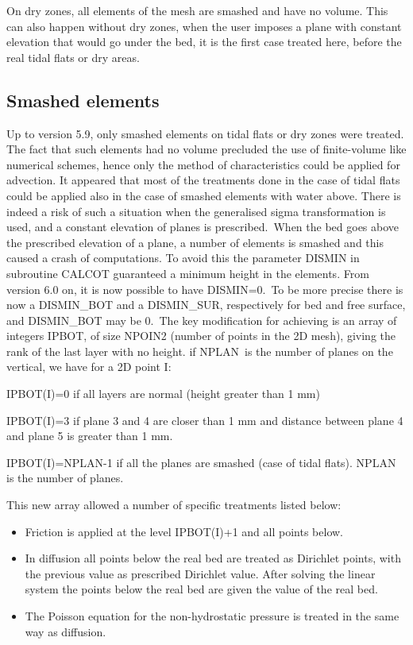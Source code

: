 On dry zones, all elements of the mesh are smashed and have no volume. This
can also happen without dry zones, when the user imposes a plane with constant
elevation that would go under the bed, it is the first case treated here,
before the real tidal flats or dry areas.

\subsection{Smashed elements}

Up to version 5.9, only smashed elements on tidal flats or dry zones were
treated. The fact that such elements had no volume precluded the use of
finite-volume like numerical schemes, hence only the method of characteristics
could be applied for advection. It appeared that most of the treatments done
in the case of tidal flats could be applied also in the case of smashed
elements with water above. There is indeed a risk of such a situation when the
generalised sigma transformation is used, and a constant elevation of planes
is prescribed.\ When the bed goes above the prescribed elevation of a
plane, a number of elements is smashed and this caused a crash of
computations. To avoid this the parameter DISMIN in subroutine CALCOT
guaranteed a minimum height in the elements. From version 6.0 on, it is now
possible to have DISMIN=0.\ To be more precise there is now a DISMIN\_BOT and
a DISMIN\_SUR, respectively for bed and free surface, and DISMIN\_BOT may
be 0.\ The key modification for achieving is an array of integers IPBOT, of
size NPOIN2 (number of points in the 2D mesh), giving the rank of the last
layer with no height. if NPLAN\ is the number of planes on the vertical, we
have for a 2D point I:

IPBOT(I)=0 if all layers are normal (height greater than 1 mm)

IPBOT(I)=3 if plane 3 and 4 are closer than 1 mm and distance between plane 4
and plane 5 is greater than 1 mm.

IPBOT(I)=NPLAN-1 if all the planes are smashed (case of tidal flats). NPLAN is
the number of planes.

This new array allowed a number of specific treatments listed below:

\begin{itemize}
\item Friction is applied at the level IPBOT(I)+1 and all points below.

\item In diffusion all points below the real bed are treated as Dirichlet
points, with the previous value as prescribed Dirichlet value. After solving
the linear system the points below the real bed are given the value of the
real bed.

\item The Poisson equation for the non-hydrostatic pressure is treated in the
same way as diffusion.
\end{itemize}

